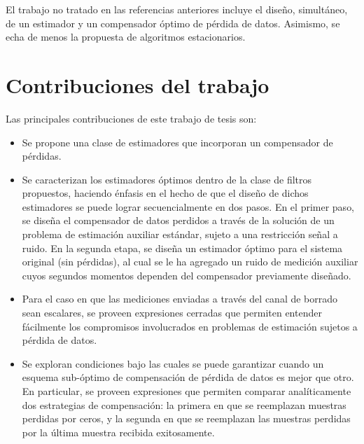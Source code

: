 El trabajo no tratado en las referencias anteriores incluye el dise\~no, simult\'aneo, de un estimador y un compensador \'optimo de p\'erdida de datos. Asimismo, se echa de menos la propuesta de algoritmos estacionarios.

\section{Contribuciones del trabajo}
Las principales contribuciones de este trabajo de tesis son:
\begin{itemize}
\item Se propone una clase de estimadores que incorporan un compensador de p\'erdidas.

\item Se caracterizan los estimadores \'optimos dentro de la clase de filtros propuestos, haciendo \'enfasis en el hecho de que el dise\~no de dichos estimadores se puede lograr secuencialmente en dos pasos. En el primer paso, se dise\~na el compensador de datos perdidos a trav\'es de la soluci\'on de un problema de estimaci\'on auxiliar est\'andar, sujeto a una restricci\'on se\~nal a ruido. En la segunda etapa, se dise\~na un estimador \'optimo para el sistema original (sin p\'erdidas), al cual se le ha agregado un ruido de medici\'on auxiliar cuyos segundos momentos dependen del compensador previamente dise\~nado.

\item Para el caso en que las mediciones enviadas a trav\'es del canal de borrado sean escalares, se proveen expresiones cerradas que permiten entender f\'acilmente los compromisos involucrados en problemas de estimaci\'on sujetos a p\'erdida de datos.

\item Se exploran condiciones bajo las cuales se puede garantizar cuando un esquema sub-\'optimo de compensaci\'on de p\'erdida de datos es mejor que otro. En particular, se proveen expresiones que permiten comparar anal\'iticamente dos estrategias de compensaci\'on: la primera en que se reemplazan muestras perdidas por ceros, y la segunda en que se reemplazan las muestras perdidas por la \'ultima muestra recibida exitosamente.
\end{itemize}

\newpage
